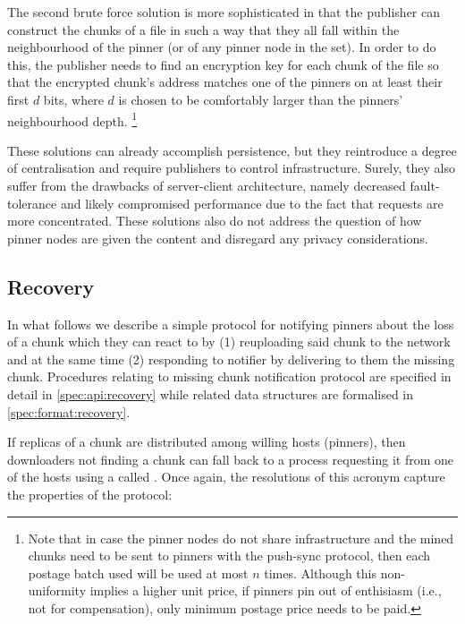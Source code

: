 The second brute force solution is more sophisticated in that the  publisher can construct the chunks of a file in such a way that they all fall within the neighbourhood of the pinner (or of any pinner node in the set). In order to do this, the publisher needs to find an encryption key for each chunk of the file so that the encrypted chunk's address matches one of the pinners on at least their first $d$ bits, where  $d$ is chosen to be comfortably larger than the pinners' neighbourhood depth.%
%
\footnote{Note that in case the pinner nodes do not share infrastructure and the mined chunks need to be sent to pinners with the push-sync protocol, then each postage batch used will be used at most $n$ times. Although this non-uniformity implies a higher unit price, if pinners pin out  of enthisiasm (i.e., not for compensation), only minimum postage price needs to  be paid.
}

These solutions can already accomplish persistence, but they reintroduce a degree of centralisation and require publishers to control infrastructure. Surely, they also suffer from the drawbacks of server-client architecture, namely decreased fault-tolerance and likely compromised performance due to the fact that requests are more concentrated. These solutions also do not address the question of how pinner nodes are given the content and disregard any privacy considerations.



\subsection{Recovery \statusyellow}\label{sec:recovery-chunks}


In what follows we describe a simple protocol for notifying pinners about the loss of a chunk which they can react to by (1) reuploading said chunk to the network and at the same time (2) responding to notifier by delivering to them the missing chunk. Procedures relating to missing chunk notification protocol are specified in detail in  \ref{spec:api:recovery} while related data structures are formalised in \ref{spec:format:recovery}.

If replicas of a chunk are distributed among willing hosts (pinners), then downloaders not finding a chunk can fall back to a  process requesting it from one of the hosts using a  called .
Once again, the resolutions of this acronym capture the properties of the protocol:


